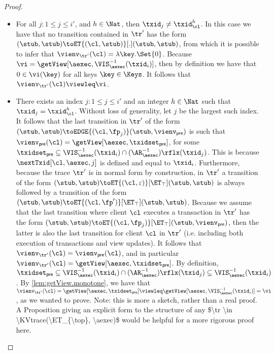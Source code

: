 \begin{proof}
\begin{itemize}
\begin{enumerate}
\begin{itemize}
\item For all $j : 1 \leq j \leq i'$, and $h \in \Nat$, then $\txid_{j} \neq \txid_{\cl}^{h}$.
In this case we have that no transition contained in $\tr'$ has the form 
$(\stub, \stub) \toET{(\cl, \stub)}[.] (\stub, \stub)$, from which it is possible to infer 
that  $\vienv_{\tr'}(\cl) = \lambda \key. \Set{0}$. Because $\vi = \getView[\aexec, \VIS^{-1}_{\aexec}(\txid_{i})]$, 
then by definition we have that $0 \in \vi(\key)$ for all keys $\key \in \Keys$. It follows that 
$\vienv_{\tr'}(\cl) \viewleq \vi$. 

\item There exists an index $j : 1 \leq j \leq i'$ and an integer $h \in \Nat$ such that $\txid_{j} = \txid_{\cl}^{h}$. 
Without loss of generality, let $j$ be the largest such index. 
It follows that the last transition in $\tr'$ of the form $(\stub, \stub) \toEDGE{(\cl, \fp_{j})} (\stub, \vienv_{\mathsf{pre}})$ 
is such that $\vienv_{\mathsf{pre}}(\cl) = \getView[\aexec, \txidset_{\mathsf{pre}}]$, 
for some $\txidset_{\mathsf{pre}} \subseteq \VIS^{-1}_{\aexec}(\txid_{i}) \cap (\AR^{-1}_{\aexec})\rflx(\txid_{j})$.
This is because $\nextTxid[\cl, \aexec, j]$  is defined and equal to $\txid_{i}$. 
Furthermore, because the trace $\tr'$ is in normal form by construction, 
in $\tr'$ a transition of the form $(\stub, \stub) \toET{(\cl, \varepsilon)}[\ET_{\top}] (\stub, \stub)$ 
is always followed by a transition of the form $(\stub, \stub) \toET{(\cl, \fp')}[\ET_{\top}] (\stub, \stub)$. 
Because we assume that the last transition where client $\cl$ executes a transaction in $\tr'$ 
has the form $(\stub, \stub) \toET{(\cl, \fp_{j})}[\ET_{\top}] (\stub, \vienv_{\mathsf{pre}})$, 
then the latter is also the last transition for client $\cl$ in $\tr'$ 
(i.e. including both execution of transactions and view updates). 
It follows that $\vienv_{\tr'}(\cl) = \vienv_{\mathsf{pre}}(\cl)$, and in particular 
$\vienv_{\tr'}(\cl) = \getView[\aexec, \txidset_{\mathsf{pre}}]$. By definition, 
$\txidset_{\mathsf{pre}} \subseteq  \VIS^{-1}_{\aexec}(\txid_{i}) \cap (\AR^{-1}_{\aexec})\rflx(\txid_{j}) 
\subseteq \VIS^{-1}_{\aexec}(\txid_{i})$. By  \cref{lem:getView.monotone}, 
we have that $\vienv_{\tr'}(\cl) = \getView[\aexec, \txidset_{\mathsf{pre}}] \viewleq 
\getView[\aexec, \VIS^{-1}_{\aexec}(\txid_{i})] = \vi$, as we wanted to prove.
\ac{Note: this is more a sketch, rather than a real proof. A Proposition giving an explicit form to the 
structure of any $\tr \in \KVtrace(\ET_{\top}, \aexec)$ would be helpful for a more rigorous proof here.}
\end{itemize}



\end{enumerate}
\end{itemize}
\end{proof}
